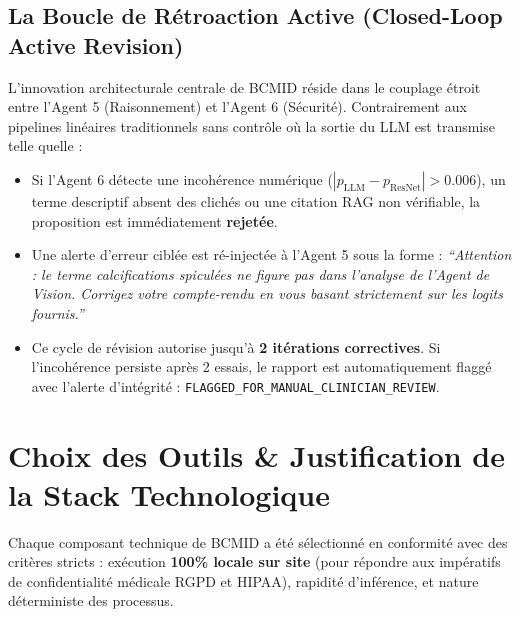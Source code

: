 \documentclass[11pt,a4paper]{article}
\begin{document}
\subsection{La Boucle de Rétroaction Active (Closed-Loop Active Revision)}
L'innovation architecturale centrale de BCMID r\'eside dans le couplage \'etroit entre l'Agent 5 (Raisonnement) et l'Agent 6 (S\'ecurit\'e). Contrairement aux pipelines lin\'eaires traditionnels sans contr\^ole o\`u la sortie du LLM est transmise telle quelle :
\begin{itemize}
    \item Si l'Agent 6 d\'etecte une incohérence numérique ($|p_{\text{LLM}} - p_{\text{ResNet}}| > 0.006$), un terme descriptif absent des clichés ou une citation RAG non v\'erifiable, la proposition est imm\'ediatement \textbf{rejetée}.
    \item Une alerte d'erreur cibl\'ee est r\'e-inject\'ee \`a l'Agent 5 sous la forme : \textit{``Attention : le terme calcifications spiculées ne figure pas dans l'analyse de l'Agent de Vision. Corrigez votre compte-rendu en vous basant strictement sur les logits fournis.''}
    \item Ce cycle de r\'evision autorise jusqu'\`a \textbf{2 it\'erations correctives}. Si l'incoh\'erence persiste apr\`es 2 essais, le rapport est automatiquement flagg\'e avec l'alerte d'int\'egrit\'e : \texttt{FLAGGED\_FOR\_MANUAL\_CLINICIAN\_REVIEW}.
\end{itemize}

\clearpage
\section{Choix des Outils \& Justification de la Stack Technologique}
\label{sec:choice_of_tools}

Chaque composant technique de BCMID a \'et\'e s\'electionn\'e en conformit\'e avec des crit\`eres stricts : ex\'ecution \textbf{100\% locale sur site} (pour r\'epondre aux imp\'eratifs de confidentialit\'e m\'edicale RGPD et HIPAA), rapidit\'e d'inf\'erence, et nature d\'eterministe des processus.
\end{document}
